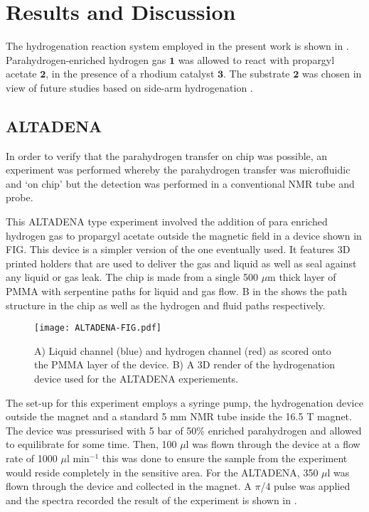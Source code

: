 \section{Results and Discussion}
The hydrogenation reaction system employed in the present work is shown in
.
Para\-hydrogen-en\-riched hydrogen gas $\mathbf{1}$ was
allowed to react with propargyl acetate $\mathbf{2}$, in the presence of
a rhodium catalyst $\mathbf{3}$. The substrate $\mathbf{2}$ was chosen in
view of future studies based on side-arm hydrogenation
\cite{Reineri:2015he,cavallari201813,cavallari2015effects}.

\subsection{ALTADENA}

In order to verify that the parahydrogen transfer on chip was possible, an
experiment was performed whereby the parahydrogen transfer was microfluidic
and ‘on chip’ but the detection was performed in a conventional NMR tube and probe.

This ALTADENA type experiment involved the addition of para enriched hydrogen
gas to propargyl acetate outside the magnetic field in a device shown in FIG. This device
is a simpler version of the one eventually used.
It features 3D printed holders that are used to deliver the gas and liquid as
well as seal against any liquid or gas leak. The chip is made from a single 500
$\mu$m thick layer of PMMA with serpentine paths for liquid and gas flow. B in the
 shows the path structure in the chip as well as the hydrogen and fluid paths
respectively.

\begin{figure}
  \begin{center}
  \texttt{[image: ALTADENA-FIG.pdf]}
  \end{center}
  \caption{A) Liquid channel (blue) and hydrogen channel (red) as scored
  onto the PMMA layer of the device. B) A 3D render of the hydrogenation device
  used for the ALTADENA experiements.}
  \label{fig:AltadenaChip}
\end{figure}

The set-up for this experiment employs a syringe pump, the hydrogenation device
outside the magnet and a standard 5 mm NMR tube inside the 16.5 T magnet. The device
was pressurised with 5 bar of 50\% enriched parahydrogen and allowed to equilibrate
for some time. Then, 100 $\mu$l was flown through the device at a flow rate of 1000
$\mu$l min$^{-1}$ this was done to ensure the sample from the experiment would reside
completely in the sensitive area. For the ALTADENA, 350 $\mu$l was flown through
the device and collected in the magnet. A $\pi$/4 pulse was applied and the spectra
recorded the result of the experiment is shown in .

